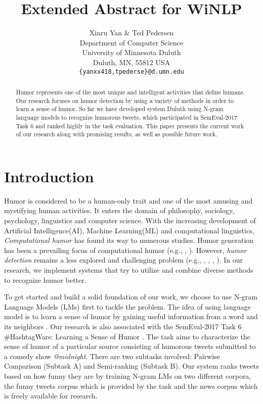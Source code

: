 \documentclass[11pt,a4paper]{article}
\title{Extended Abstract for WiNLP}
\author{Xinru Yan \& Ted Pedersen\\
  Department of Computer Science \\ University of Minnesota Duluth \\ Duluth, MN, 55812 USA \\
  {\tt \{yanxx418,tpederse\}@d.umn.edu}}
\date{}
\begin{document}
\maketitle
\begin{abstract}
Humor represents one of the most unique and intelligent activities that define humans. Our research focuses on humor detection by using a variety of methods in order to learn a sense of humor. So far we have developed system Duluth using N-gram language models to recognize humorous tweets, which participated in SemEval-2017 Task 6 and ranked highly in the task evaluation. This paper presents the current work of our research along with promising results, as well as possible future work.
\end{abstract}

\section{Introduction}
Humor is considered to be a human-only trait and one of the most amusing and mystifying human activities. It enters the domain of philosophy, sociology, psychology, linguistics and computer science. With the increasing development of Artificial Intelligence(AI), Machine Learning(ML) and computational linguistics, \textit{Computational humor} has found its way to numerous studies. Humor generation has been a prevailing focus of computational humor (e.g., \cite{StockS03}, \cite{ozbal2012computational}). However, \textit{humor detection} remains a less explored and challenging problem (e.g., \cite{Learning:To:Laugh}, \cite{Recognizing:Humor:On:Twitter}, \cite{ShahafHM15}, \cite{MillerG15}). In our research, we implement systems that try to utilize and combine diverse methods to recognize humor better.    

To get started and build a solid foundation of our work, we choose to use N-gram Language Models (LMs) first to tackle the problem. The idea of using language model is to learn a sense of humor by gaining useful information from a word and its neighbors \cite{JM}. Our research is also associated with the SemEval-2017 Task 6 \#HashtagWars: Learning a Sense of Humor \cite{PotashRR17}. The task aims to characterize the sense of humor of a particular source consisting of humorous tweets submitted to a comedy show \textit{@midnight}. There are two subtasks involved: Pairwise Comparison (Subtask A) and Semi-ranking (Subtask B). Our system ranks tweets based on how funny they are by training N-gram LMs on two different corpora, the funny tweets corpus which is provided by the task and the news corpus which is freely available for research. 
\end{document}
